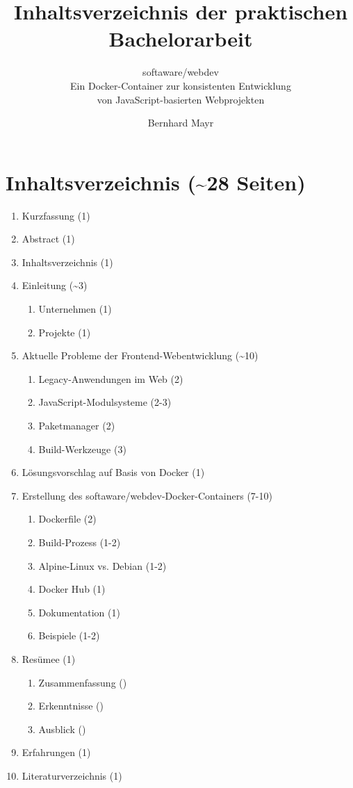 \documentclass[a4paper, parskip=false, ngerman]{scrreprt}
\begin{document}
\title{Inhaltsverzeichnis der praktischen Bachelorarbeit}
\subtitle{softaware/webdev\\Ein Docker-Container zur konsistenten Entwicklung\\von JavaScript-basierten Webprojekten}
\author{Bernhard Mayr}
\maketitle

\chapter{Inhaltsverzeichnis (\textasciitilde28 Seiten)}

\begin{enumerate}[label*=\arabic*.]
    \item Kurzfassung (1)
    \item Abstract (1)
    \item Inhaltsverzeichnis (1)
    \item Einleitung (\textasciitilde3)
    \begin{enumerate}[label*=\arabic*.]
        \item Unternehmen (1)
        \item Projekte (1)
    \end{enumerate}
    \item Aktuelle Probleme der Frontend-Webentwicklung (\textasciitilde10)
    \begin{enumerate}[label*=\arabic*.]
        \item Legacy-Anwendungen im Web (2)
        \item JavaScript-Modulsysteme (2-3)
        \item Paketmanager (2)
        \item Build-Werkzeuge (3)
    \end{enumerate}
    \item Lösungsvorschlag auf Basis von Docker (1)
    \item Erstellung des softaware/webdev-Docker-Containers (7-10)
    \begin{enumerate}[label*=\arabic*.]
        \item Dockerfile (2)
        \item Build-Prozess (1-2)
        \item Alpine-Linux vs. Debian (1-2)
        \item Docker Hub (1)
        \item Dokumentation (1)
        \item Beispiele (1-2)
    \end{enumerate}
    \item Resümee (1)
    \begin{enumerate}[label*=\arabic*.]
        \item Zusammenfassung ()
        \item Erkenntnisse ()
        \item Ausblick ()
    \end{enumerate}
    \item Erfahrungen (1)
    \item Literaturverzeichnis (1)
\end{enumerate}
\end{document}
